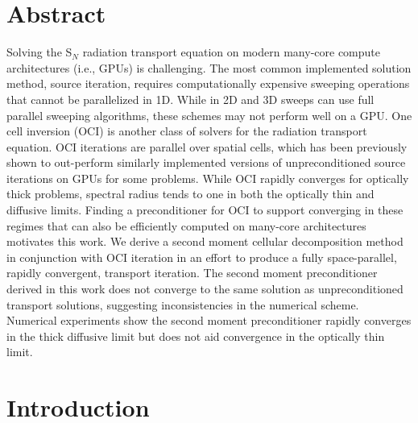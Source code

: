 \section*{Abstract}
Solving the S$_N$ radiation transport equation on modern many-core compute architectures (i.e., GPUs) is challenging.
The most common implemented solution method, source iteration, requires computationally expensive sweeping operations that cannot be parallelized in 1D.
While in 2D and 3D sweeps can use full parallel sweeping algorithms, these schemes may not perform well on a GPU.
One cell inversion (OCI) is another class of solvers for the radiation transport equation.
OCI iterations are parallel over spatial cells, which has been previously shown to out-perform similarly implemented versions of unpreconditioned source iterations on GPUs for some problems.
While OCI rapidly converges for optically thick problems, spectral radius tends to one in both the optically thin and diffusive limits.
Finding a preconditioner for OCI to support converging in these regimes that can also be efficiently computed on many-core architectures motivates this work.
We derive a second moment cellular decomposition method in conjunction with OCI iteration in an effort to produce a fully space-parallel, rapidly convergent, transport iteration.
The second moment preconditioner derived in this work does not converge to the same solution as unpreconditioned transport solutions, suggesting inconsistencies in the numerical scheme.
Numerical experiments show the second moment preconditioner rapidly converges in the thick diffusive limit but does not aid convergence in the optically thin limit.

\section{Introduction}

